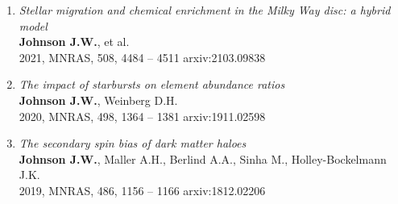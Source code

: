 \documentclass[cv.tex]{subfiles}
\begin{document}
\begin{enumerate}
	\item \textit{Stellar migration and chemical enrichment in the Milky Way
	disc: a hybrid model}
	\\
	\textbf{Johnson J.W.}, et al.
	\\
	2021, MNRAS, 508, 4484 -- 4511 \hfill arxiv:2103.09838

	\item \textit{The impact of starbursts on element abundance ratios}
	\\
	\textbf{Johnson J.W.}, Weinberg D.H.
	\\
	2020, MNRAS, 498, 1364 -- 1381 \hfill arxiv:1911.02598

	\item \textit{The secondary spin bias of dark matter haloes}
	\\
	\textbf{Johnson J.W.}, Maller A.H., Berlind A.A., Sinha M.,
	Holley-Bockelmann J.K.
	\\
	2019, MNRAS, 486, 1156 -- 1166 \hfill arxiv:1812.02206

\end{enumerate}
\end{document}

